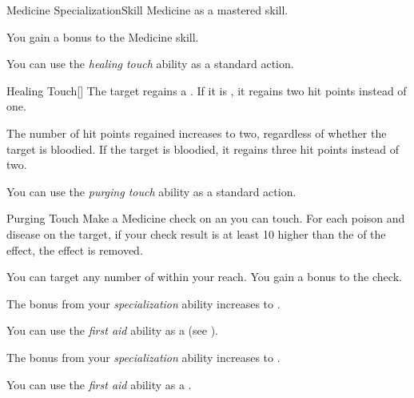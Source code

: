     \begin{feat}{Medicine Specialization}{Skill}
        \featpre Medicine as a mastered skill.

         You gain a  bonus to the Medicine skill.

         You can use the \textit{healing touch} ability as a standard action.
        \begin{freeability}{Healing Touch}[]
            The target regains a .
            If it is , it regains two hit points instead of one.

            \rankline
             The number of hit points regained increases to two, regardless of whether the target is bloodied.
             If the target is bloodied, it regains three hit points instead of two.
        \end{freeability}

         You can use the \textit{purging touch} ability as a standard action.
        \begin{freeability}{Purging Touch}
            Make a Medicine check on an  you can touch.
            For each poison and disease on the target, if your check result is at least 10 higher than the  of the effect, the effect is removed.

            \rankline
             You can target any number of  within your reach.
             You gain a  bonus to the check.
        \end{freeability}

         The bonus from your \textit{specialization} ability increases to .

         You can use the \textit{first aid} ability as a  (see ).

         The bonus from your \textit{specialization} ability increases to .

         You can use the \textit{first aid} ability as a .
    \end{feat}

